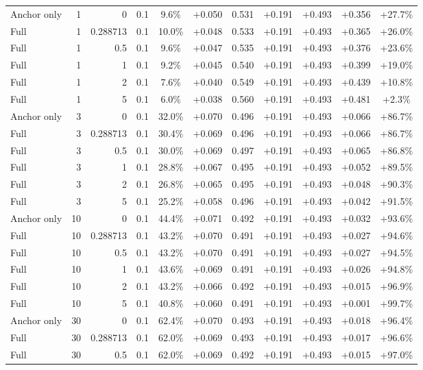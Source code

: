 \begin{table}[htbp]
\begin{tabular}{lrrrccccccc}
Anchor only & 1 & 0 & 0.1 & 9.6\% & +0.050 & 0.531 & +0.191 & +0.493 & +0.356 & +27.7\% \\
Full & 1 & 0.288713 & 0.1 & 10.0\% & +0.048 & 0.533 & +0.191 & +0.493 & +0.365 & +26.0\% \\
Full & 1 & 0.5 & 0.1 & 9.6\% & +0.047 & 0.535 & +0.191 & +0.493 & +0.376 & +23.6\% \\
Full & 1 & 1 & 0.1 & 9.2\% & +0.045 & 0.540 & +0.191 & +0.493 & +0.399 & +19.0\% \\
Full & 1 & 2 & 0.1 & 7.6\% & +0.040 & 0.549 & +0.191 & +0.493 & +0.439 & +10.8\% \\
Full & 1 & 5 & 0.1 & 6.0\% & +0.038 & 0.560 & +0.191 & +0.493 & +0.481 & +2.3\% \\
Anchor only & 3 & 0 & 0.1 & 32.0\% & +0.070 & 0.496 & +0.191 & +0.493 & +0.066 & +86.7\% \\
Full & 3 & 0.288713 & 0.1 & 30.4\% & +0.069 & 0.496 & +0.191 & +0.493 & +0.066 & +86.7\% \\
Full & 3 & 0.5 & 0.1 & 30.0\% & +0.069 & 0.497 & +0.191 & +0.493 & +0.065 & +86.8\% \\
Full & 3 & 1 & 0.1 & 28.8\% & +0.067 & 0.495 & +0.191 & +0.493 & +0.052 & +89.5\% \\
Full & 3 & 2 & 0.1 & 26.8\% & +0.065 & 0.495 & +0.191 & +0.493 & +0.048 & +90.3\% \\
Full & 3 & 5 & 0.1 & 25.2\% & +0.058 & 0.496 & +0.191 & +0.493 & +0.042 & +91.5\% \\
Anchor only & 10 & 0 & 0.1 & 44.4\% & +0.071 & 0.492 & +0.191 & +0.493 & +0.032 & +93.6\% \\
Full & 10 & 0.288713 & 0.1 & 43.2\% & +0.070 & 0.491 & +0.191 & +0.493 & +0.027 & +94.6\% \\
Full & 10 & 0.5 & 0.1 & 43.2\% & +0.070 & 0.491 & +0.191 & +0.493 & +0.027 & +94.5\% \\
Full & 10 & 1 & 0.1 & 43.6\% & +0.069 & 0.491 & +0.191 & +0.493 & +0.026 & +94.8\% \\
Full & 10 & 2 & 0.1 & 43.2\% & +0.066 & 0.492 & +0.191 & +0.493 & +0.015 & +96.9\% \\
Full & 10 & 5 & 0.1 & 40.8\% & +0.060 & 0.491 & +0.191 & +0.493 & +0.001 & +99.7\% \\
Anchor only & 30 & 0 & 0.1 & 62.4\% & +0.070 & 0.493 & +0.191 & +0.493 & +0.018 & +96.4\% \\
Full & 30 & 0.288713 & 0.1 & 62.0\% & +0.069 & 0.493 & +0.191 & +0.493 & +0.017 & +96.6\% \\
Full & 30 & 0.5 & 0.1 & 62.0\% & +0.069 & 0.492 & +0.191 & +0.493 & +0.015 & +97.0\% \\

\end{tabular}
\end{table}
